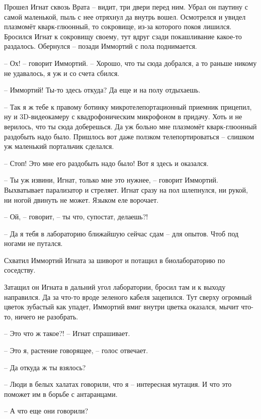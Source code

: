 \documentclass[ebook,oneside,final,openright]{memoir}
\begin{document}
\par
Прошел Игнат сквозь Врата – видит, три двери перед ним. Убрал он паутину с самой маленькой, пыль с нее отряхнул да внутрь вошел. Осмотрелся и увидел плазмомёт кварк-глюонный, то сокровище, из-за которого покоя лишился. Бросился Игнат к сокровищу своему, тут вдруг сзади покашливание какое-то раздалось. Обернулся – позади Иммортий с пола поднимается.\par
– Ох! – говорит Иммортий. – Хорошо, что ты сюда добрался, а то раньше никому не удавалось, я уж и со счета сбился.\par
– Иммортий! Ты-то здесь откуда? Да еще и на полу отдыхаешь.\par
– Так я ж тебе к правому ботинку микротелепортационный приемник прицепил, ну и 3D-видеокамеру с квадрофоническим микрофоном в придачу. Хоть и не верилось, что ты сюда доберешься. Да уж больно мне плазмомёт кварк-глюонный раздобыть надо было. Пришлось вот даже ползком телепортироваться – слишком уж маленький портальчик сделался.\par
– Стоп! Это мне его раздобыть надо было! Вот я здесь и оказался.\par
– Ты уж извини, Игнат, только мне это нужнее, – говорит Иммортий. Выхватывает парализатор и стреляет. Игнат сразу на пол шлепнулся, ни рукой, ни ногой двинуть не может. Языком еле ворочает.\par
– Ой, – говорит, – ты что, супостат, делаешь?!\par
– Да я тебя в лабораторию ближайшую сейчас сдам – для опытов. Чтоб под ногами не путался.\par
Схватил Иммортий Игната за шиворот и потащил в биолабораторию по соседству.\par
\par
Затащил он Игната в дальний угол лаборатории, бросил там и к выходу направился. Да за что-то вроде зеленого кабеля зацепился. Тут сверху огромный цветок зубастый как упадет, Иммортий вмиг внутри цветка оказался, мычит что-то, ничего не разобрать.\par
\par
– Это что ж такое?! – Игнат спрашивает.\par
– Это я, растение говорящее, – голос отвечает.\par
– Да откуда ж ты взялось?\par
– Люди в белых халатах говорили, что я – интересная мутация. И что это поможет им в борьбе с антаранцами.\par
– А что еще они говорили?\par
\end{document}
